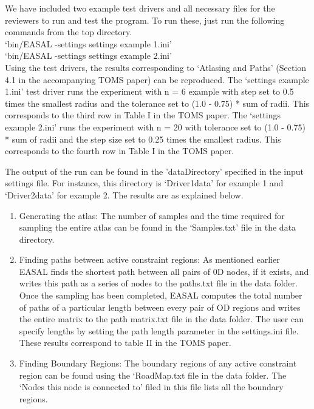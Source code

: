 \documentclass[10pt]{article}
\begin{document}
We have included two example test drivers and all necessary files for the
reviewers to run and test the program. To run these, just run the following
commands from the top directory.\\


`bin/EASAL -settings settings example 1.ini'\\


`bin/EASAL -settings settings example 2.ini'\\

Using the test drivers, the results corresponding to `Atlasing and Paths'
(Section 4.1 in the accompanying TOMS paper) can be reproduced. The `settings
example 1.ini' test driver runs the experiment with n = 6 example with step set
to 0.5 times the smallest radius and the tolerance set to (1.0 - 0.75) * sum of
radii. This corresponds to the third row in Table I in the TOMS paper. The
`settings example 2.ini' runs the experiment with n = 20 with tolerance set to
(1.0 - 0.75) * sum of radii and the step size set to 0.25 times the smallest
radius. This corresponds to the fourth row in Table I in the TOMS paper. 

The output of the run can be found in the 'dataDirectory' specified in the
input settings file. For instance, this directory is `Driver1data' for example 1 
and `Driver2data' for example 2. The results are as explained below.

\begin{enumerate}
\item Generating the atlas: The number of samples and the time required for sampling the entire atlas can
be found in the `Samples.txt' file in the data directory.

\item Finding paths between active constraint regions: As mentioned earlier
EASAL finds the shortest path between all pairs of 0D nodes, if it exists, and
writes this path as a series of nodes to the paths.txt file in the data folder.
Once the sampling has been completed, EASAL computes the total number of paths
of a particular length between every pair of OD regions and writes the entire
matrix to the path matrix.txt file in the data folder. The user can specify
lengths by setting the path length parameter in the settings.ini file. These
results correspond to table II in the TOMS paper.

\item Finding Boundary Regions: The boundary regions of any active constraint
region can be found using the `RoadMap.txt file in the data folder. The `Nodes
this node is connected to' filed in this file lists all the boundary regions.
\end{enumerate}
\end{document}
